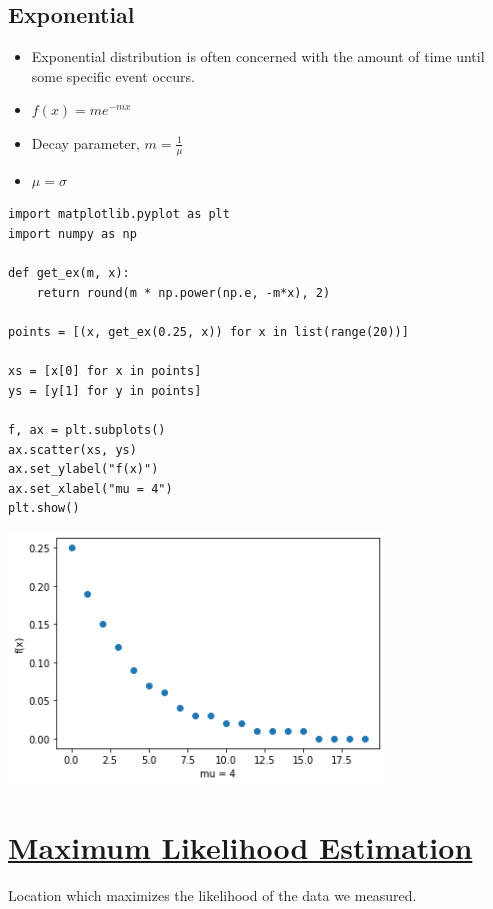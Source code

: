 \documentclass[11pt]{article}
\begin{document}
\subsection{Exponential}
\label{sec:orge66665b}

\begin{itemize}
\item Exponential distribution is often concerned with the amount of time until some specific event occurs.
\item \(f(x) = me^{-mx}\)
\item Decay parameter, \(m = \frac{1}{\mu}\)
\item \(\mu = \sigma\)
\end{itemize}

\begin{verbatim}
import matplotlib.pyplot as plt
import numpy as np

def get_ex(m, x):
    return round(m * np.power(np.e, -m*x), 2)

points = [(x, get_ex(0.25, x)) for x in list(range(20))]

xs = [x[0] for x in points]
ys = [y[1] for y in points]

f, ax = plt.subplots()
ax.scatter(xs, ys)
ax.set_ylabel("f(x)")
ax.set_xlabel("mu = 4")
plt.show()
\end{verbatim}

\begin{center}
\includegraphics[width=10cm]{./obipy-resources/Mow79W.png}
\end{center}

\section{\underline{Maximum Likelihood Estimation}}
\label{sec:orgf6bcfb9}

Location which maximizes the likelihood of the data we measured.
\end{document}
